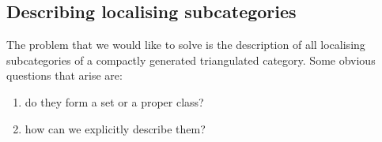 \documentclass[10pt,a4paper]{article}
\begin{document}
\subsection{Describing localising subcategories}
The problem that we would like to solve is the description of all localising subcategories of a compactly generated triangulated category. Some obvious questions that arise are:
\begin{enumerate}
  \item do they form a set or a proper class?
  \item how can we explicitly describe them?
\end{enumerate}

\end{document}
